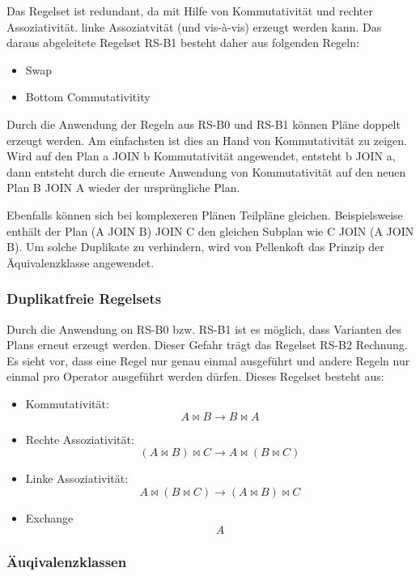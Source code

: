 Das Regelset ist redundant, da mit Hilfe von Kommutativität und rechter Assoziativität. linke Assoziatvität (und vis-à-vis) erzeugt werden kann. Das daraus abgeleitete Regelset RS-B1 besteht daher aus folgenden Regeln:

\begin{itemize}
\item Swap
\item Bottom Commutativitity
\end{itemize}

Durch die Anwendung der Regeln aus RS-B0 und RS-B1 können Pläne doppelt erzeugt werden. Am einfachsten ist dies an Hand von Kommutativität zu zeigen. Wird auf den Plan a JOIN b Kommutativität angewendet, entsteht b JOIN a, dann entsteht durch  die erneute Anwendung von Kommutativität auf den neuen Plan B JOIN A wieder der ursprüngliche Plan.

Ebenfalls können sich bei komplexeren Plänen Teilpläne gleichen. Beispielsweise enthält der Plan (A JOIN B) JOIN C den gleichen Subplan wie C JOIN (A JOIN B). Um solche Duplikate zu verhindern, wird von Pellenkoft das Prinzip der Äquivalenzklasse  angewendet.



\subsubsection{Duplikatfreie Regelsets}
Durch die Anwendung on RS-B0 bzw. RS-B1 ist es möglich, dass Varianten des Plans erneut erzeugt werden. Dieser Gefahr trägt das Regelset RS-B2 Rechnung. Es sieht vor, dass eine Regel nur genau einmal ausgeführt und andere Regeln nur einmal pro Operator ausgeführt werden dürfen. Dieses Regelset besteht aus:


\begin{itemize}
\item Kommutativität: $$ A \Join B \to B \Join A$$
\item Rechte Assoziativität: $$(A \Join B) \Join C \to A \Join (B \Join C) $$
\item Linke Assoziativität: $$A \Join (B \Join C) \to (A \Join B) \Join C$$

\item Exchange $$A$$
\end{itemize}

\subsubsection{Äuqivalenzklassen}

